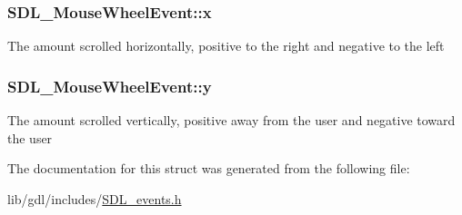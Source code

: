 \subsubsection[{x}]{ S\+D\+L\+\_\+\+Mouse\+Wheel\+Event\+::x}\label{struct_s_d_l___mouse_wheel_event_a6d904eef474ea45a5b1828fcb5b0f859}
The amount scrolled horizontally, positive to the right and negative to the left \hypertarget{struct_s_d_l___mouse_wheel_event_a53fdf77a464426bc8b30e629795f044b}{}
\subsubsection[{y}]{ S\+D\+L\+\_\+\+Mouse\+Wheel\+Event\+::y}\label{struct_s_d_l___mouse_wheel_event_a53fdf77a464426bc8b30e629795f044b}
The amount scrolled vertically, positive away from the user and negative toward the user 

The documentation for this struct was generated from the following file\+:\begin{DoxyCompactItemize}
\item 
lib/gdl/includes/\hyperlink{_s_d_l__events_8h}{S\+D\+L\+\_\+events.\+h}\end{DoxyCompactItemize}
